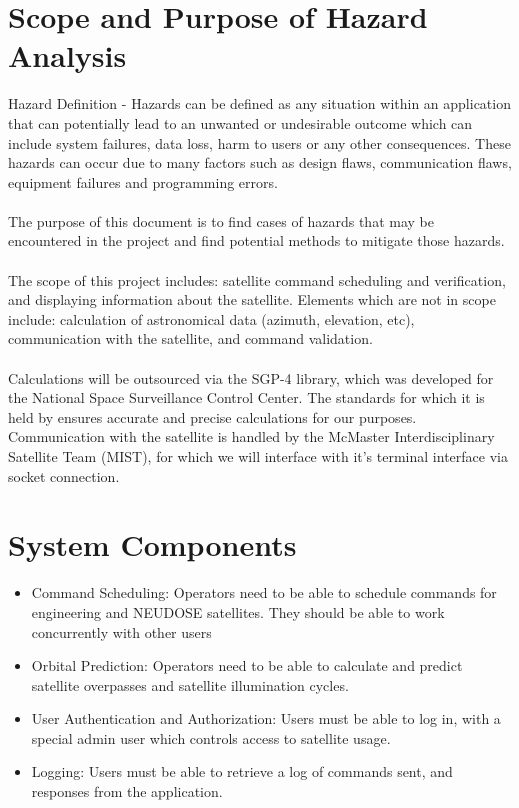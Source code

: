 \documentclass{article}
\begin{document}
\section{Scope and Purpose of Hazard Analysis}
Hazard Definition - Hazards can be defined as any situation within an application that can potentially lead to an unwanted or undesirable outcome which can include system failures, data loss, harm to users or any other consequences. These hazards can occur due to many factors such as design flaws, communication flaws, equipment failures and programming errors. 
\\ \\
The purpose of this document is to find cases of hazards that may be encountered in the project and find potential methods to mitigate those hazards.
\\ \\
The scope of this project includes: satellite command scheduling and verification, and displaying information about the satellite. Elements which are not in scope include: calculation of astronomical data (azimuth, elevation, etc), communication with the satellite, and command validation.
\\ \\
Calculations will be outsourced via the SGP-4 library, which was developed for the National Space Surveillance Control Center. The standards for which it is held by ensures accurate and precise calculations for our purposes. Communication with the satellite is handled by the McMaster Interdisciplinary Satellite Team (MIST), for which we will interface with it's terminal interface via socket connection.

\section{System Components}
\begin{itemize}
    \item Command Scheduling: 
Operators need to be able to schedule commands for engineering and NEUDOSE satellites. They should be able to work concurrently with other users

\item Orbital Prediction:
Operators need to be able to calculate and predict satellite overpasses and satellite illumination cycles.
 \item User Authentication and Authorization: 
Users must be able to log in, with a special admin user which controls access to satellite usage.


\item Logging:
Users must be able to retrieve a log of commands sent, and responses from the application.

\end{itemize}
\end{document}
